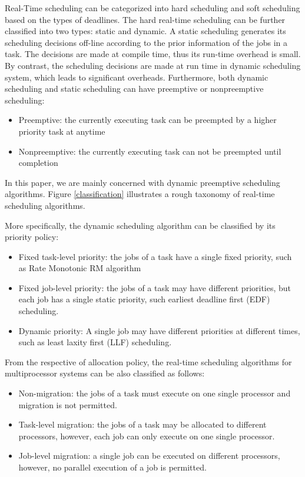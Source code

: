\documentclass[preprint,12pt]{elsarticle}
\begin{document}
Real-Time scheduling can be categorized into hard scheduling and soft scheduling based on the types of deadlines. The hard real-time scheduling can be further classified into two types: static and dynamic. A static scheduling generates its scheduling decisions off-line according to the prior information of the jobs in a task. The decisions are made at compile time, thus its run-time overhead is small. By contrast, the scheduling decisions are made at run time in dynamic scheduling system, which leads to significant overheads. Furthermore, both dynamic scheduling and static scheduling can have preemptive or nonpreemptive scheduling:

\begin{itemize}
\item Preemptive: the currently executing task can be preempted by a higher priority task at anytime
\item Nonpreemptive: the currently executing task can not be preempted until completion
\end{itemize}

In this paper, we are mainly concerned with dynamic preemptive scheduling algorithms. Figure \ref{classification} illustrates a rough taxonomy of real-time scheduling algorithms.


More specifically, the dynamic scheduling algorithm can be classified by its priority policy\cite{davis2011survey}:

\begin{itemize}
\item Fixed task-level priority: the jobs of a task have a single fixed priority, such as Rate Monotonic RM algorithm

\item Fixed job-level priority: the jobs of a task may have different priorities, but each job has a single static priority, such earliest deadline first (EDF) scheduling.

\item Dynamic priority: A single job may have different priorities at different times, such as least laxity first (LLF) scheduling.
\end{itemize}


From the respective of allocation policy, the real-time scheduling algorithms for multiprocessor systems can be also classified as follows\cite{davis2011survey}:

\begin{itemize}
\item Non-migration: the jobs of a task must execute on one single processor and migration is not permitted.

\item Task-level migration: the jobs of a task may be allocated to different processors, however, each job can only execute on one single processor.

\item Job-level migration: a single job can be executed on different processors, however, no parallel execution of a job is permitted.
\end{itemize}
\end{document}
